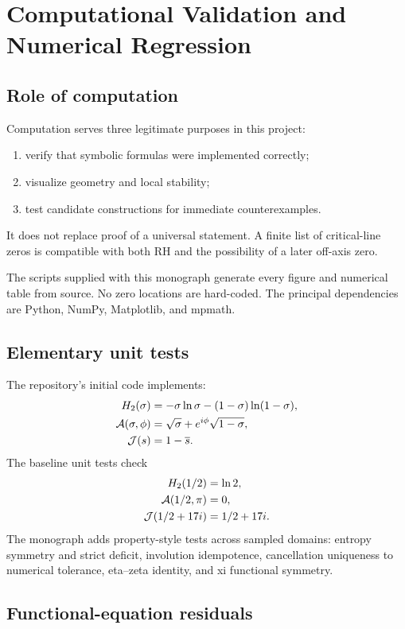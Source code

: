 \chapter{Computational Validation and Numerical Regression}
\label{chap:computation}

\section{Role of computation}

Computation serves three legitimate purposes in this project:
\begin{enumerate}
  \item verify that symbolic formulas were implemented correctly;
  \item visualize geometry and local stability;
  \item test candidate constructions for immediate counterexamples.
\end{enumerate}
It does not replace proof of a universal statement. A finite list of critical-line zeros is compatible with both RH and the possibility of a later off-axis zero.

The scripts supplied with this monograph generate every figure and numerical table from source. No zero locations are hard-coded. The principal dependencies are Python, NumPy, Matplotlib, and mpmath.

\section{Elementary unit tests}

The repository's initial code implements:
\begin{align*}
 H_2(\sigma)&=-\sigma\ln\sigma-(1-\sigma)\ln(1-\sigma),\\
 \mathcal{A}(\sigma,\phi)&=\sqrt\sigma+e^{i\phi}\sqrt{1-\sigma},\\
 \mathcal{J}(s)&=1-\overline{s}.
\end{align*}
The baseline unit tests check
\begin{align*}
 H_2(1/2)&=\ln2,\\
 \mathcal{A}(1/2,\pi)&=0,\\
 \mathcal{J}(1/2+17i)&=1/2+17i.
\end{align*}
The monograph adds property-style tests across sampled domains: entropy symmetry and strict deficit, involution idempotence, cancellation uniqueness to numerical tolerance, eta--zeta identity, and xi functional symmetry.

\section{Functional-equation residuals}

